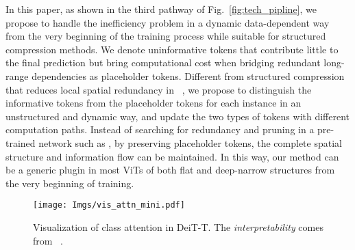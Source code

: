 \documentclass[letterpaper]{article} \usepackage{aaai22}  \usepackage{times}  \usepackage{helvet}  \usepackage{courier}  \usepackage[hyphens]{url}  \usepackage{graphicx} \urlstyle{rm} \def\UrlFont{\rm}  \usepackage{natbib}  \usepackage{caption} \DeclareCaptionStyle{ruled}{labelfont=normalfont,labelsep=colon,strut=off} \frenchspacing  \setlength{\pdfpagewidth}{8.5in}  \setlength{\pdfpageheight}{11in}  \usepackage{algorithm}
\begin{document}
In this paper, as shown in the third pathway of Fig.~\ref{fig:tech_pipline}, we propose to handle the inefficiency problem in a dynamic data-dependent way from the very beginning of the training process while suitable for structured compression methods. We denote uninformative tokens that contribute little to the final prediction but bring computational cost when bridging redundant long-range dependencies as placeholder tokens. Different from structured compression that reduces local spatial redundancy in ~\cite{PVT, LeViT}, we propose to distinguish the informative tokens from the placeholder tokens for each instance in an unstructured and dynamic way, and update the two types of tokens with different computation paths. 
Instead of searching for redundancy and pruning in a pre-trained network such as \cite{PatchSlimming, DynamicViT}, by preserving placeholder tokens, 
the complete spatial structure and information flow can be maintained.
In this way, our method can be a generic plugin in most ViTs of both flat and deep-narrow structures from the very beginning of training.




\begin{figure}[t]
    \centering
    \texttt{[image: Imgs/vis\_attn\_mini.pdf]} \caption{Visualization of class attention in DeiT-T. The \textit{interpretability} comes from ~\cite{Trans_interpretability}.}
    \label{fig:fig1}
    \vspace{-5mm}
\end{figure}
\end{document}
